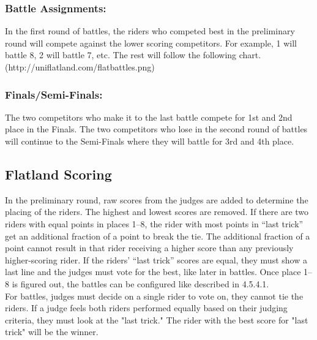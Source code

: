 \subsubsection{Battle Assignments:}
In the first round of battles, the riders who competed best in the preliminary round will compete against the lower scoring competitors. For example, 1 will battle 8, 2 will battle 7, etc. The rest will follow the following chart. (http://uniflatland.com/flatbattles.png)

\subsubsection{Finals/Semi-Finals:}
The two competitors who make it to the last battle compete for 1st and 2nd place in the Finals. The two competitors who lose in the
second round of battles will continue to the Semi-Finals where they will battle for 3rd and 4th place.

\subsection{Flatland Scoring}
In the preliminary round, raw scores from the judges are added to determine the placing of the riders. The highest and lowest scores are removed. If there are two riders with equal points in places 1–8, the rider with most points in “last trick” get an additional fraction of a point to break the tie. The additional fraction of a point cannot result in that rider receiving a higher score than any previously higher-scoring rider. If the riders' “last trick” scores are equal, they must show a last line and the judges must vote for the best, like later in battles. Once place 1–8 is figured out, the battles can be configured like described in 4.5.4.1. \\
For battles, judges must decide on a single rider to vote on, they cannot tie the riders. If a judge feels both riders
performed equally based on their judging criteria, they must look at the "last trick." The rider with the best score for "last trick" will be the winner.
 
